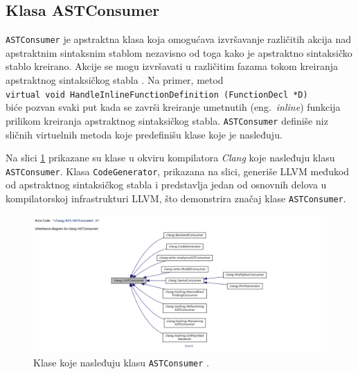 \documentclass[12pt,oneside]{memoir}
\begin{document}
\subsection{Klasa ASTConsumer}

\texttt{ASTConsumer} je apstraktna klasa koja omogu\'{c}ava izvr\v{s}avanje razli\v{c}itih akcija nad apstraktnim sintaksnim stablom nezavisno od toga kako je apstraktno sintaksi\v{c}ko stablo kreirano.
Akcije se mogu izvr\v{s}avati u razli\v{c}itim fazama tokom kreiranja apstraktnog sintaksi\v{c}kog stabla \cite{ASTToolTutorial}. Na primer, metod \\ \texttt{virtual void  HandleInlineFunctionDefinition (FunctionDecl *D)} \\ bi\'{c}e pozvan svaki put kada se zavr\v{s}i kreiranje umetnutih (eng.~\textit{inline}) funkcija prilikom kreiranja apstraktnog sintaksi\v{c}kog stabla. \texttt{ASTConsumer} defini\v{s}e niz sli\v{c}nih virtuelnih metoda koje predefini\v{s}u klase koje je nasleđuju. \par
Na slici \ref{fig:inhDiagram} prikazane su klase u okviru kompilatora \textit{Clang} koje nasleđuju klasu \texttt{ASTConsumer}. Klasa \texttt{CodeGenerator}, prikazana na slici,
generi\v{s}e LLVM međukod od apstraktnog sintaksi\v{c}kog stabla i predstavlja jedan od osnovnih delova u kompilatorskoj infrastrukturi LLVM, \v{s}to demonstrira zna\v{c}aj klase \texttt{ASTConsumer}. 

\begin{figure}[!h]
\begin{center}
\includegraphics[scale=0.3]{ASTConsumer2.png}
\end{center}
\caption{Klase koje nasleđuju klasu \texttt{ASTConsumer} \cite{ASTConsumer}.}
\label{fig:inhDiagram}
\end{figure}
\end{document}
